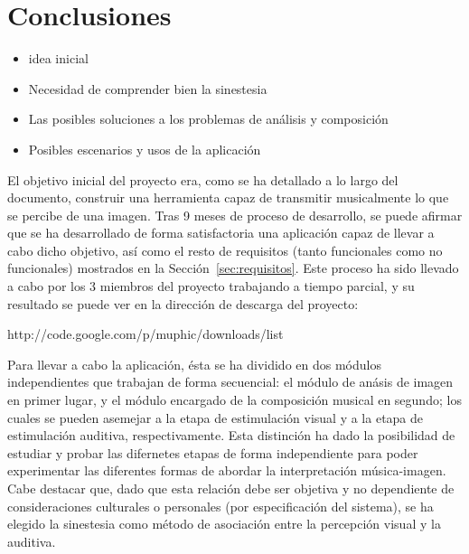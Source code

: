 \chapter{Conclusiones}
\label{chap:results}






\begin{itemize}
	
	\item idea inicial
	\item Necesidad de comprender bien la sinestesia
	\item Las posibles soluciones a los problemas de análisis y composición
	\item Posibles escenarios y usos de la aplicación

\end{itemize}

El objetivo inicial del proyecto era, como se ha detallado a lo largo del documento, construir una herramienta capaz de transmitir musicalmente lo que se percibe de una imagen. Tras 9 meses de proceso de desarrollo, se puede afirmar que se ha desarrollado de forma satisfactoria una aplicación capaz de llevar a cabo dicho objetivo, así como el resto de requisitos (tanto funcionales como no funcionales) mostrados en la Sección~\ref{sec:requisitos}. Este proceso ha sido llevado a cabo por los 3 miembros del proyecto trabajando a tiempo parcial, y su resultado se puede ver en la dirección de descarga del proyecto:\\

\begin{center}
http://code.google.com/p/muphic/downloads/list
\end{center}


Para llevar a cabo la aplicación, ésta se ha dividido en dos módulos independientes que trabajan de forma secuencial: el módulo de anásis de imagen en primer lugar, y el módulo encargado de la composición musical en segundo; los cuales se pueden asemejar a la etapa de estimulación visual y a la etapa de estimulación auditiva, respectivamente. Esta distinción ha dado la posibilidad de estudiar y probar las difernetes etapas de forma independiente para poder experimentar las diferentes formas de abordar la interpretación música-imagen. Cabe destacar que, dado que esta relación debe ser objetiva y no dependiente de consideraciones culturales o personales (por especificación del sistema), se ha elegido la sinestesia como método de asociación entre la percepción visual y la auditiva.\\


